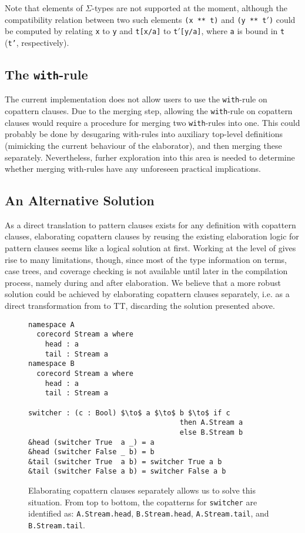 Note that elements of $\Sigma$-types are
not supported at the moment, although the compatibility relation between two
such elements \texttt{(x~**~t)} and \texttt{(y~**~t$'$)} could be computed by
relating \texttt{x} to \texttt{y} and \texttt{t[x/a]} to \texttt{t$'$[y/a]},
where \texttt{a} is bound in \texttt{t} (\texttt{t'}, respectively).

\subsection{The \texttt{with}-rule}
The current implementation does not allow users to use the \texttt{with}-rule on
copattern clauses. Due to the merging step, allowing the \texttt{with}-rule on
copattern clauses would require a procedure for merging two
\texttt{with}-rules into one. This could probably be done by desugaring
with-rules into auxiliary top-level definitions (mimicking the current behaviour
of the elaborator), and then merging these separately. Nevertheless, furher
exploration into this area is needed to determine whether merging with-rules
have any unforeseen practical implications.

\subsection{An Alternative Solution}
As a direct translation to pattern clauses exists for any definition with
copattern clauses, elaborating copattern clauses by reusing the existing
elaboration logic for pattern clauses seems like a logical solution at
first. Working at the level of \IdrisM{} gives rise to many limitations, though,
since most of the type information on terms, case trees, and coverage checking
is not available until later in the compilation process, namely during and after
elaboration. We believe that a more robust solution could be achieved by
elaborating copattern clauses separately, i.e. as a direct transformation from
\IdrisM{} to TT, discarding the solution presented
above.

\begin{figure}[h]
\begin{lstlisting}[mathescape]
namespace A
  corecord Stream a where
    head : a
    tail : Stream a
namespace B
  corecord Stream a where
    head : a
    tail : Stream a

switcher : (c : Bool) $\to$ a $\to$ b $\to$ if c
                                    then A.Stream a 
                                    else B.Stream b
&head (switcher True  a _) = a
&head (switcher False _ b) = b
&tail (switcher True  a b) = switcher True a b
&tail (switcher False a b) = switcher False a b   
\end{lstlisting}
  \caption{Elaborating copattern clauses separately allows us to solve this
    situation. From top to bottom, the copatterns for \texttt{switcher} are
    identified as: \texttt{A.Stream.head}, \texttt{B.Stream.head},
    \texttt{A.Stream.tail}, and \texttt{B.Stream.tail}.}
  \label{fig:copatterns_type_disambiguation}
\end{figure}

